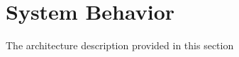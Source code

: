 \section{System Behavior}
\label{sec:SysBehavior}

The architecture description provided in this section 